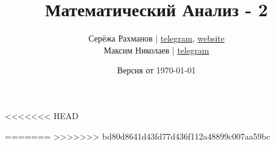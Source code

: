 \documentclass[a4paper]{article}
\title{\Huge Математический Анализ - 2}
\author{
    Серёжа Рахманов | \href{https://t.me/virg1n}{telegram}, \href{http://shoraii.github.io}{website}
    \\
    Максим Николаев | \href{https://t.me/MaximND}{telegram}

}
\date{Версия от {\ddmmyyyydate\today} \currenttime}
\begin{document}
    \maketitle

    \tableofcontents

    \newpage

    
    
    
<<<<<<< HEAD
    
=======
>>>>>>> bd80d8641d43fd77d436f112a48899c007aa59bc
\end{document}

